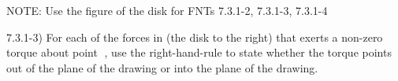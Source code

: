 \label{fnt7.3.1-3}

NOTE: Use the figure of the disk for FNTs 7.3.1-2, 7.3.1-3, 7.3.1-4

7.3.1-3) For each of the forces in (the disk to the right) that exerts a non-zero torque about point , use the right-hand-rule to state whether the torque points out of the plane of the drawing or into the plane of the drawing.